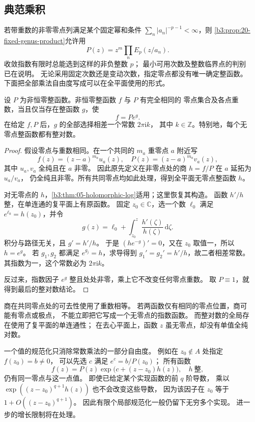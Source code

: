 \subsection{典范乘积}
\label{b3:subsec:200302}

若带重数的非零零点列满足某个固定幂和条件
\(\sum_n|a_n|^{-p-1}<\infty\)，则
\cref{b3:prop:20-fixed-genus-product}允许用
\[
 P(z)=z^m\prod_nE_p(z/a_n).
\]
收敛指数有限时总能选到这样的非负整数 \(p\)；
最小可用次数及整数临界点的判别已在说明。
无论采用固定次数还是变动次数，指定零点都没有唯一确定整函数。
下面把全部乘法自由度写成可以在全平面使用的形式。

\begin{proposition}[同零点函数的乘法自由度]\label{b3:prop:20-same-zero-factorization}
设 \(P\) 为非恒零整函数。非恒零整函数 \(f\) 与 \(P\) 有完全相同的
零点集合及各点重数，当且仅当存在整函数 \(g\)，使
\[
 f=P e^g.
\]
在给定 \(f,P\) 后，\(g\) 的全部选择相差一个常数 \(2\pi\mathrm i k\)，
其中 \(k\in\mathbb Z\)。特别地，每个无零点整函数都有整对数。
\end{proposition}
\begin{proof}
假设零点与重数相同。在一个共同的 \(m_a\) 重零点 \(a\) 附近写
\[
 f(z)=(z-a)^{m_a}u_a(z),\quad
 P(z)=(z-a)^{m_a}v_a(z),
\]
其中 \(u_a,v_a\) 全纯且在 \(a\) 非零。
因此原先定义在非零点处的商 \(h=f/P\) 在 \(a\) 延拓为 \(u_a/v_a\)，
仍全纯且非零。所有共同零点均如此处理，得到全平面无零点整函数 \(h\)。

对无零点的 \(h\)，\cref{b3:thm:05-holomorphic-log}适用；这里恢复其构造。
函数 \(h'/h\) 整，在单连通的复平面上有原函数。
固定 \(z_0\in\mathbb C\)，选一个数 \(\ell_0\) 满足
\(e^{\ell_0}=h(z_0)\)，并令
\[
 g(z)=\ell_0+\int_{z_0}^z\frac{h'(\zeta)}{h(\zeta)}\,\mathrm d\zeta.
\]
积分与路径无关，且 \(g'=h'/h\)。
于是 \((he^{-g})'=0\)，又在 \(z_0\) 取值一，所以 \(h=e^g\)。
若 \(g_1,g_2\) 都满足 \(e^{g_j}=h\)，求导得到
\(g_1'=g_2'=h'/h\)，故二者相差常数。
其指数为一，这个常数必为 \(2\pi\mathrm i k\)。

反过来，指数因子 \(e^g\) 整且处处非零，乘上它不改变任何零点重数。
取 \(P\equiv1\)，就得到最后的整对数结论。
\end{proof}

商在共同零点处的可去性使用了重数相等。
若两函数仅有相同的零点位置，商可能有零点或极点，
不能立即把它写成一个无零点的指数函数。
而整对数的全局存在使用了复平面的单连通性；
在去心平面上，函数 \(z\) 虽无零点，却没有单值全纯对数。

\ProseParagraphBreak
一个值的规范化只消除常数乘法的一部分自由度。
例如在 \(z_0\notin A\) 处指定 \(f(z_0)=b\ne0\)，
可以先选 \(c\) 满足 \(e^c=b/P(z_0)\)；
所有函数
\[
 f(z)=P(z)\exp\bigl(c+(z-z_0)h(z)\bigr),\quad h\ \text{整},
\]
仍有同一零点与这一点值。
即使已给定某个实现函数的前 \(q\) 阶导数，
乘以 \(\exp((z-z_0)^{q+1}h(z))\) 也不会改变这些导数，
因为该因子在 \(z_0\) 等于 \(1+O((z-z_0)^{q+1})\)。
因此有限个局部规范化一般仍留下无穷多个实现。
进一步的增长限制将在处理。

